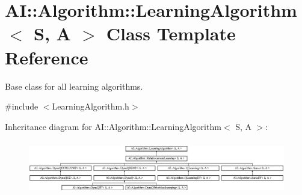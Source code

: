 \hypertarget{classAI_1_1Algorithm_1_1LearningAlgorithm}{\section{A\-I\-:\-:Algorithm\-:\-:Learning\-Algorithm$<$ S, A $>$ Class Template Reference}
\label{classAI_1_1Algorithm_1_1LearningAlgorithm}
}


Base class for all learning algorithms.  




{\ttfamily \#include $<$Learning\-Algorithm.\-h$>$}

Inheritance diagram for A\-I\-:\-:Algorithm\-:\-:Learning\-Algorithm$<$ S, A $>$\-:\begin{figure}[H]
\begin{center}
\leavevmode
\includegraphics[height=2.397260cm]{classAI_1_1Algorithm_1_1LearningAlgorithm}
\end{center}
\end{figure}
